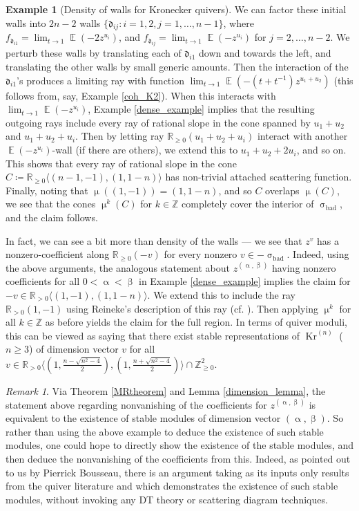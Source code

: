 \documentclass{amsart}
\DeclareMathOperator{\moKr}{Kr}
\newcommand{\Kr}[1]{\moKr^{(#1)}}
\DeclareMathOperator{\EE}{\mathbb{E}}
\DeclareMathOperator{\bad}{bad}
\let\bb=\mathbb
\let\rar=\rightarrow
\let\f=\mathfrak
\renewcommand{\alpha}{\upalpha}
\renewcommand{\beta}{\upbeta}
\renewcommand{\sigma}{\upsigma}
\renewcommand{\mu}{\upmu}
\theoremstyle{plain}%
\theoremstyle{definition}
\newtheorem{eg}[thm]{Example}
\theoremstyle{remark}
\newtheorem{rmk}[thm]{Remark}
\begin{document}
\begin{eg}[Density of walls for Kronecker quivers]
We can factor these initial walls into $2n-2$ walls $\{\f{d}_{ij}\colon  i=1,2, j=1,\ldots,n-1\}$, where $f_{\f{d}_{i1}}= \lim_{t\rar 1} \EE(-2z^{u_i})$, and $f_{\f{d}_{ij}}= \lim_{t\rar 1}  \EE(-z^{u_i})$ for $j=2,\ldots,n-2$.  We perturb these walls by translating each of $\f{d}_{i1}$ down and towards the left, and translating the other walls by small generic amounts.  Then the interaction of the $\f{d}_{i1}$'s produces a limiting ray with function $\lim_{t\rar 1}\EE(-(t+t^{-1})z^{u_1+u_2})$ (this follows from, say, Example \ref{coh_K2}).  When this interacts with $\lim_{t\rar 1} \EE(-z^{u_i})$, Example \ref{dense_example} implies that the resulting outgoing rays include every ray of rational slope in the cone spanned by $u_1+u_2$ and $u_1+u_2+u_i$.  Then by letting ray $\bb{R}_{\geq 0}(u_1+u_2+u_i)$ interact with another $\EE(-z^{u_i})$-wall (if there are others), we extend this to $u_1+u_2+2u_i$, and so on.  This shows that every ray of rational slope in the cone $C\coloneqq \bb{R}_{\geq 0}\langle(n-1,-1),(1,1-n)\rangle$ has non-trivial attached scattering function.  Finally, noting that $\mu((1,-1))=(1,1-n)$, and so $C$ overlaps $\mu(C)$, we see that the cones $\mu^k(C)$ for $k\in \bb{Z}$ completely cover the interior of $\sigma_{\bad}$, and the claim follows.

In fact, we can see a bit more than density of the walls --- we see that $z^{v}$ has a nonzero-coefficient along $\bb{R}_{\geq 0}(-v)$ for every nonzero $v\in -\sigma_{\bad}$.  Indeed, using the above arguments, the analogous statement about $z^{(\alpha,\beta)}$ having nonzero coefficients for all $0<\alpha<\beta$ in Example \ref{dense_example} implies the claim for $-v\in \bb{R}_{>0} \langle(1,-1),(1,1-n)\rangle$.  We extend this to include the ray $\bb{R}_{>0} (1,-1)$ using Reineke's description of this ray \cite[Thm. 6.4]{ReinCompos} (cf. \cite[Ex. 1.15]{GHKK}).  Then applying $\mu^k$  for all $k\in \bb{Z}$ as before yields the claim for the full region.  In terms of quiver moduli, this can be viewed as saying that there exist stable representations of $\Kr{n}$ ($n\geq 3$) of dimension vector $v$ for all $v\in \bb{R}_{> 0} \langle (1,\frac{n-\sqrt{n^2-4}}{2}),(1,\frac{n+\sqrt{n^2-4}}{2}) \rangle\cap \bb{Z}_{\geq 0}^2$.
\end{eg}

\begin{rmk}
Via Theorem \ref{MRtheorem} and Lemma \ref{dimension_lemma}, the statement above regarding nonvanishing of the coefficients for $z^{(\alpha,\beta)}$ is equivalent to the existence of stable modules of dimension vector $(\alpha,\beta)$.  So rather than using the above example to deduce the existence of such stable modules, one could hope to directly show the existence of the stable modules, and then deduce the nonvanishing of the coefficients from this.  Indeed, as pointed out to us by Pierrick Bousseau, there is an argument taking as its inputs only results from the quiver literature \cite{Kac} and \cite{Scho} which demonstrates the existence of such stable modules, without invoking any DT theory or scattering diagram techniques.
\end{rmk}
\end{document}
